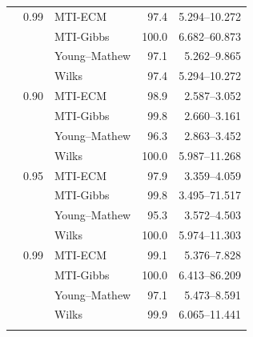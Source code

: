\begin{longtable}{@{}rrlrr@{}}
\addlinespace[0.3em]
500 & 0.99 & MTI-ECM & 97.4 & 5.294--10.272 \\
 &  & MTI-Gibbs & 100.0 & 6.682--60.873 \\
 &  & Young--Mathew & 97.1 & 5.262--9.865 \\
 &  & Wilks & 97.4 & 5.294--10.272 \\
\addlinespace[0.3em]
1000 & 0.90 & MTI-ECM & 98.9 & 2.587--3.052 \\
 &  & MTI-Gibbs & 99.8 & 2.660--3.161 \\
 &  & Young--Mathew & 96.3 & 2.863--3.452 \\
 &  & Wilks & 100.0 & 5.987--11.268 \\
\addlinespace[0.3em]
1000 & 0.95 & MTI-ECM & 97.9 & 3.359--4.059 \\
 &  & MTI-Gibbs & 99.8 & 3.495--71.517 \\
 &  & Young--Mathew & 95.3 & 3.572--4.503 \\
 &  & Wilks & 100.0 & 5.974--11.303 \\
\addlinespace[0.3em]
1000 & 0.99 & MTI-ECM & 99.1 & 5.376--7.828 \\
 &  & MTI-Gibbs & 100.0 & 6.413--86.209 \\
 &  & Young--Mathew & 97.1 & 5.473--8.591 \\
 &  & Wilks & 99.9 & 6.065--11.441 \\
\addlinespace[0.3em]
\end{longtable}
\clearpage
